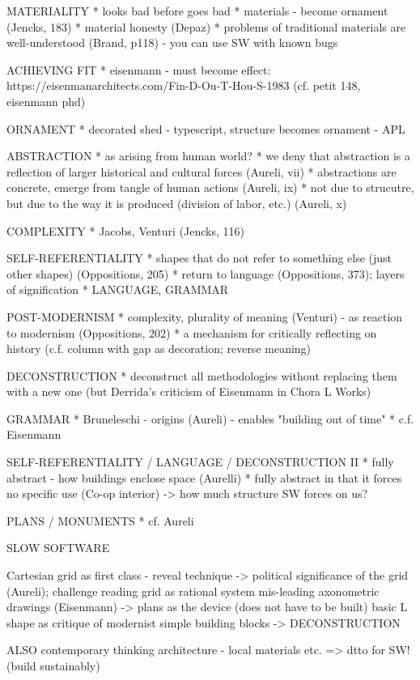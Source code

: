 MATERIALITY
* looks bad before goes bad
* materials - become ornament (Jencks, 183)
* material honesty (Depaz)
* problems of traditional materials are well-understood (Brand, p118) - you can use SW with known bugs

ACHIEVING FIT
* eisenmann - must become effect: https://eisenmanarchitects.com/Fin-D-Ou-T-Hou-S-1983
  (cf. petit 148, eisenmann phd)

ORNAMENT
* decorated shed - typescript, structure becomes ornament - APL

ABSTRACTION
* as arising from human world?
* we deny that abstraction is a reflection of larger historical and cultural forces (Aureli, vii)
* abstractions are concrete, emerge from tangle of human actions (Aureli, ix)
* not due to strucutre, but due to the way it is produced (division of labor, etc.) (Aureli, x)

COMPLEXITY
* Jacobs, Venturi (Jencks, 116)

SELF-REFERENTIALITY
* shapes that do not refer to something else (just other shapes) (Oppositions, 205)
* return to language (Oppositions, 373); layers of signification
* LANGUAGE, GRAMMAR

POST-MODERNISM
* complexity, plurality of meaning (Venturi) - as reaction to modernism (Oppositions, 202)
* a mechanism for critically reflecting on history
  (c.f. column with gap as decoration; reverse meaning)

DECONSTRUCTION
* deconstruct all methodologies without replacing them with a new one
  (but Derrida's criticism of Eisenmann in Chora L Works)

GRAMMAR
* Bruneleschi - origins (Aureli) - enables "building out of time"
* c.f. Eisenmann

SELF-REFERENTIALITY / LANGUAGE / DECONSTRUCTION II
* fully abstract - how buildings enclose space (Aurelli)
* fully abstract in that it forces no specific use (Co-op interior)
-> how much structure SW forces on us?

PLANS / MONUMENTS
* cf. Aureli


SLOW SOFTWARE

Cartesian grid as first class - reveal technique
-> political significance of the grid (Aureli); challenge reading grid as rational system
mis-leading axonometric drawings (Eisenmann)
-> plans as the device (does not have to be built)
basic L shape as critique of modernist simple building blocks
-> DECONSTRUCTION

ALSO contemporary thinking architecture - local materials etc.
=> dtto for SW! (build sustainably)

\theendnotes
